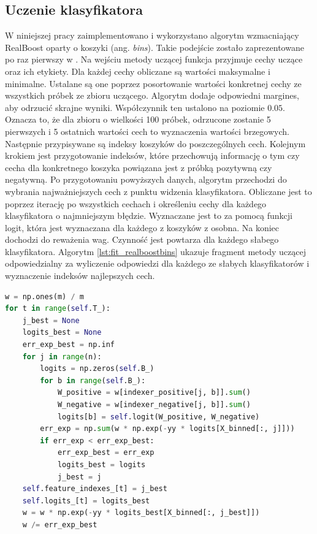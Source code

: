 \subsection{Uczenie klasyfikatora}
W niniejszej pracy zaimplementowano i wykorzystano algorytm wzmacniający RealBoost oparty o koszyki (ang. \textit{bins}).
Takie podejście zostało zaprezentowane po raz pierwszy w \cite{1689652}.
Na wejściu metody uczącej funkcja przyjmuje cechy uczące oraz ich etykiety.
Dla każdej cechy obliczane są wartości maksymalne i minimalne.
Ustalane są one poprzez posortowanie wartości konkretnej cechy ze wszystkich próbek ze zbioru uczącego.
Algorytm dodaje odpowiedni margines, aby odrzucić skrajne wyniki.
Współczynnik ten ustalono na poziomie $0.05$.
Oznacza to, że dla zbioru o wielkości 100 próbek, odrzucone zostanie 5 pierwszych i 5 ostatnich wartości cech to wyznaczenia wartości brzegowych.
Następnie przypisywane są indeksy koszyków do poszczególnych cech.
Kolejnym krokiem jest przygotowanie indeksów, które przechowują informację o tym czy cecha dla konkretnego koszyka powiązana jest z próbką pozytywną czy negatywną.
Po przygotowaniu powyższych danych, algorytm przechodzi do wybrania najważniejszych cech z punktu widzenia klasyfikatora.
Obliczane jest to poprzez iterację po wszystkich cechach i określeniu cechy dla każdego klasyfikatora o najmniejszym błędzie.
Wyznaczane jest to za pomocą funkcji logit, która jest wyznaczana dla każdego z koszyków z osobna.
Na koniec dochodzi do reważenia wag.
Czynność jest powtarza dla każdego słabego klasyfikatora.
Algorytm \ref{lst:fit_realboostbins} ukazuje fragment metody uczącej odpowiedzialny za wyliczenie odpowiedzi dla każdego ze słabych klasyfikatorów i wyznaczenie indeksów najlepszych cech.
\begin{lstlisting}[language=Python, caption=Procedura ucząca klasyfikator RealBoostBins, label={lst:fit_realboostbins}]
w = np.ones(m) / m
for t in range(self.T_):
    j_best = None
    logits_best = None
    err_exp_best = np.inf
    for j in range(n):
        logits = np.zeros(self.B_)
        for b in range(self.B_):
            W_positive = w[indexer_positive[j, b]].sum()
            W_negative = w[indexer_negative[j, b]].sum()
            logits[b] = self.logit(W_positive, W_negative)
        err_exp = np.sum(w * np.exp(-yy * logits[X_binned[:, j]]))
        if err_exp < err_exp_best:
            err_exp_best = err_exp
            logits_best = logits
            j_best = j
    self.feature_indexes_[t] = j_best
    self.logits_[t] = logits_best
    w = w * np.exp(-yy * logits_best[X_binned[:, j_best]])
    w /= err_exp_best

\end{lstlisting}
